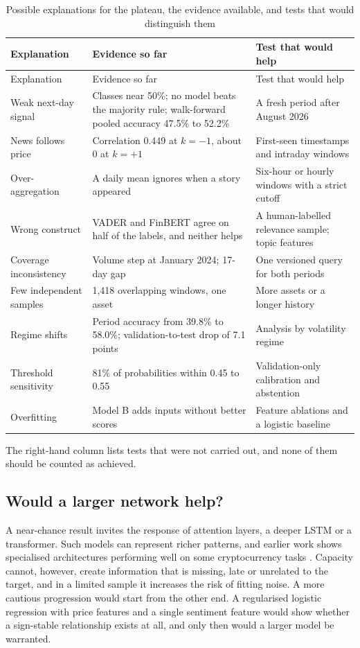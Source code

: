 \begin{longtable}{p{3.1cm}p{5.6cm}p{5.0cm}}
\caption{Possible explanations for the plateau, the evidence available, and tests that would distinguish them}\label{tab:causes}\\
\toprule
Explanation & Evidence so far & Test that would help\\\midrule\endfirsthead
\toprule
Explanation & Evidence so far & Test that would help\\\midrule\endhead
Weak next-day signal & Classes near 50\%; no model beats the majority rule; walk-forward pooled accuracy 47.5\% to 52.2\% & A fresh period after August 2026\\
News follows price & Correlation 0.449 at $k=-1$, about 0 at $k=+1$ & First-seen timestamps and intraday windows\\
Over-aggregation & A daily mean ignores when a story appeared & Six-hour or hourly windows with a strict cutoff\\
Wrong construct & VADER and FinBERT agree on half of the labels, and neither helps & A human-labelled relevance sample; topic features\\
Coverage inconsistency & Volume step at January 2024; 17-day gap & One versioned query for both periods\\
Few independent samples & 1,418 overlapping windows, one asset & More assets or a longer history\\
Regime shifts & Period accuracy from 39.8\% to 58.0\%; validation-to-test drop of 7.1 points & Analysis by volatility regime\\
Threshold sensitivity & 81\% of probabilities within 0.45 to 0.55 & Validation-only calibration and abstention\\
Overfitting & Model B adds inputs without better scores & Feature ablations and a logistic baseline\\
\bottomrule
\end{longtable}

The right-hand column lists tests that were not carried out, and none of them should be counted as achieved.

\subsection{Would a larger network help?}
A near-chance result invites the response of attention layers, a deeper LSTM or a transformer. Such models can represent richer patterns, and earlier work shows specialised architectures performing well on some cryptocurrency tasks \cite{seabe2025,tiwari2025}. Capacity cannot, however, create information that is missing, late or unrelated to the target, and in a limited sample it increases the risk of fitting noise. A more cautious progression would start from the other end. A regularised logistic regression with price features and a single sentiment feature would show whether a sign-stable relationship exists at all, and only then would a larger model be warranted.


